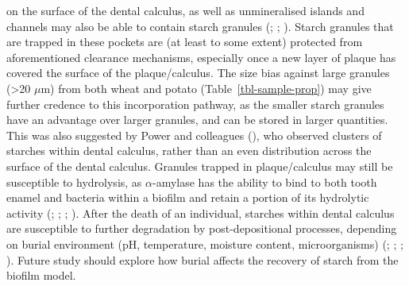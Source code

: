 \documentclass[
  b5paper,
]{book}
\begin{document}
on the surface of the dental calculus, as well as unmineralised islands
and channels may also be able to contain starch granules
(;
;
). Starch granules that are trapped in these pockets are (at least
to some extent) protected from aforementioned clearance mechanisms,
especially once a new layer of plaque has covered the surface of the
plaque/calculus. The size bias against large granules (\textgreater20
\(\mu\)m) from both wheat and potato (Table~\ref{tbl-sample-prop}) may
give further credence to this incorporation pathway, as the smaller
starch granules have an advantage over larger granules, and can be
stored in larger quantities. This was also suggested by Power and
colleagues (), who observed
clusters of starches within dental calculus, rather than an even
distribution across the surface of the dental calculus. Granules trapped
in plaque/calculus may still be susceptible to hydrolysis, as
\(\alpha\)-amylase has the ability to bind to both tooth enamel and
bacteria within a biofilm and retain a portion of its hydrolytic
activity (; ; ; ). After the death of an individual, starches within dental
calculus are susceptible to further degradation by post-depositional
processes, depending on burial environment (pH, temperature, moisture
content, microorganisms)
(;
;
;
). Future study
should explore how burial affects the recovery of starch from the
biofilm model.
\end{document}
